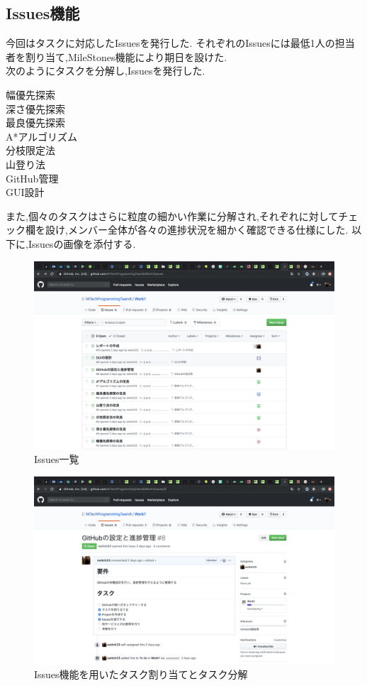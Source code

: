 \documentclass[uplatex,12pt]{jsarticle}
\begin{document}
\subsection{Issues機能}
今回はタスクに対応したIssuesを発行した.
それぞれのIssuesには最低1人の担当者を割り当て,MileStones機能により期日を設けた. \\
次のようにタスクを分解し,Issuesを発行した.
\begin{description}
  \item[幅優先探索]
  \item[深さ優先探索]
  \item[最良優先探索]
  \item[A*アルゴリズム]
  \item[分枝限定法]
  \item[山登り法]
  \item[GitHub管理]
  \item[GUI設計]     
\end{description}
また,個々のタスクはさらに粒度の細かい作業に分解され,それぞれに対してチェック欄を設け,メンバー全体が各々の進捗状況を細かく確認できる仕様にした.
以下に,Issuesの画像を添付する.

\begin{figure}[!hbt]
  \centering
  \includegraphics[scale=0.20]{git_image/issues_list_image.png}
  \caption{Issues一覧}
\end{figure}

\begin{figure}[!hbt]
  \centering
  \includegraphics[scale=0.20]{git_image/issues_image.png}
  \caption{Issues機能を用いたタスク割り当てとタスク分解}
\end{figure}
\end{document}
